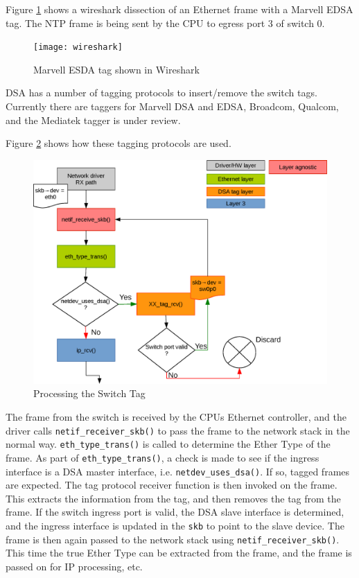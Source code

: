 \documentclass[letterpaper]{article}
\begin{document}
Figure \ref{wireshark} shows a wireshark dissection of an Ethernet
frame with a Marvell EDSA tag. The NTP frame is being sent by the CPU
to egress port 3 of switch 0.

\begin{figure}[ht]
  \centering
  \texttt{[image: wireshark]}
  \caption{Marvell ESDA tag shown in Wireshark}
  \label{wireshark}
\end{figure}

DSA has a number of tagging protocols to insert/remove the switch
tags. Currently there are taggers for Marvell DSA and EDSA, Broadcom,
Qualcom, and the Mediatek tagger is under review.

Figure \ref{stackflow} shows how these tagging protocols are used.

\begin{figure}[ht]
  \centering
  \includegraphics[width=\columnwidth]{dsa_explained.eps}
  \caption{Processing the Switch Tag}
  \label{stackflow}
\end{figure}

The frame from the switch is received by the CPUs Ethernet controller,
and the driver calls \verb|netif_receiver_skb()| to pass the frame to
the network stack in the normal way. \verb|eth_type_trans()| is called
to determine the Ether Type of the frame. As part of
\verb|eth_type_trans()|, a check is made to see if the ingress
interface is a DSA master interface, i.e. \verb|netdev_uses_dsa()|. If
so, tagged frames are expected. The tag protocol receiver function is
then invoked on the frame. This extracts the information from the tag,
and then removes the tag from the frame. If the switch ingress port is
valid, the DSA slave interface is determined, and the ingress
interface is updated in the \verb|skb| to point to the slave
device. The frame is then again passed to the network stack using
\verb|netif_receiver_skb()|. This time the true Ether Type can be
extracted from the frame, and the frame is passed on for IP
processing, etc.
\end{document}
